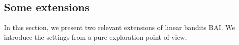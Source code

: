 
\subsection{Some extensions}\label{sec:lgc.complexity.examples}

In this section, we present two relevant extensions of linear bandits BAI. We introduce the settings from a pure-exploration point of view.


